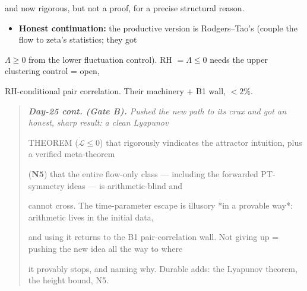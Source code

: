 \documentclass[10pt]{article}
\begin{document}
  and now rigorous, but not a proof, for a precise structural reason.\par
\begin{itemize}
\item \textbf{Honest continuation:} the productive version is Rodgers--Tao's (couple the flow to zeta's statistics; they got
\end{itemize}
  $\Lambda\ge0$ from the lower fluctuation control). RH $=\Lambda\le0$ needs the upper clustering control = open,\par
  RH-conditional pair correlation. Their machinery + B1 wall, $<2\%$.\par

\begin{quote}\itshape
\textbf{Day-25 cont. (Gate B).} Pushed the new path to its crux and got an honest, sharp result: a clean Lyapunov\par
THEOREM ($\dot{\mathcal L}\le0$) that rigorously vindicates the attractor intuition, plus a verified meta-theorem\par
(\textbf{N5}) that the entire flow-only class --- including the forwarded PT-symmetry ideas --- is arithmetic-blind and\par
cannot cross. The time-parameter escape is illusory *in a provable way*: arithmetic lives in the initial data,\par
and using it returns to the B1 pair-correlation wall. Not giving up = pushing the new idea all the way to where\par
it provably stops, and naming why. Durable adds: the Lyapunov theorem, the height bound, N5.\par
\end{quote}
\end{document}
